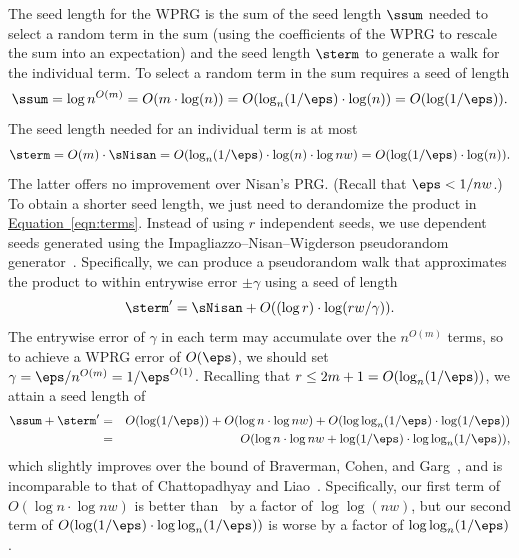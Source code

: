 \documentclass[11pt]{article}
\newcommand{\expeqref}[2]{\texorpdfstring{\hyperref[#2]{#1~\eqref{#2}}}{#1~\eqref{#2}}}
\begin{document}
    The seed length
    for the WPRG is the sum of the seed length $\ssum$ needed to select a random term in the sum (using the coefficients of the WPRG to rescale the sum into an expectation) and the seed length $\sterm$ to generate a walk for the individual term.
    To select a random term in the sum requires a seed of length
    $$\ssum = \log n^{O(m)}=O(m\cdot \log(n))=O(\log_{n}(1/\eps)\cdot\log(n))=O(\log(1/\eps)).$$
    The seed length needed for an individual term is at most $$\sterm = O(m)\cdot \sNisan=O(\log_{n}(1/\eps)\cdot \log(n)\cdot\log nw) = O(\log(1/\eps)\cdot \log(n)).$$ 
    The latter offers no improvement over Nisan's PRG. (Recall that $\eps<1/nw$.) To obtain a shorter seed length, we just need to derandomize the product in \expeqref{Equation}{eqn:terms}.  Instead of using $r$ independent seeds, we use dependent seeds generated using the Impagliazzo--Nisan--Wigderson pseudorandom generator~\cite{ImpagliazzoNiWi94}.  Specifically, we can produce a pseudorandom walk that approximates the product to within entrywise error $\pm \gamma$ using a seed of length 
    $$\sterm' = \sNisan+O((\log r)\cdot \log(rw/\gamma)).$$
    The entrywise error of $\gamma$ in each term may accumulate over the $n^{O(m)}$ terms, so to achieve a WPRG error of $O(\eps)$, we should set $\gamma=\eps/n^{O(m)}=1/\eps^{O(1)}$.  Recalling that $r\leq 2m+1 = O(\log_{n}(1/\eps))$, we attain a seed length of
    \begin{eqnarray*}
    \ssum+\sterm' 
    &=& O(\log(1/\eps)) + O(\log n\cdot \log nw) + O(\log\log_{n}(1/\eps)\cdot \log(1/\eps))\\
    &=& O(\log n\cdot \log nw + \log(1/\eps)\cdot \log\log_{n}(1/\eps)),
    \end{eqnarray*}
    which slightly improves over the bound of Braverman, Cohen, and Garg~\cite{BravermanCoGa18}, and is incomparable to that of Chattopadhyay and Liao~\cite{ChattopadhyayLi20}. Specifically, our first term of $O(\log n\cdot \log nw)$ is better than~\cite{ChattopadhyayLi20} by a factor of $\log\log(nw)$, but our second term of $O(\log(1/\eps)\cdot \log\log_{n}(1/\eps))$ is worse by a factor of $\log\log_{n}(1/\eps)$.
    
\end{document}
